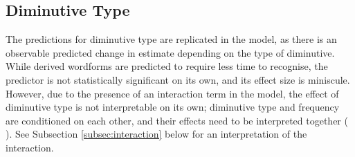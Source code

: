 \begin{table}[h]
\centering
\label{tab:reg-fixed}
\caption[Summary of fixed effects from the experimental model]{Summary of fixed effects from the experimental model. All continuous predictors centered and standardised, categorical predictor \textit{Diminutive Type} sum-coded, predictors the effects of which have achieved significance ($p$<0.05) have their names and $p$-values in boldface.}
\end{table}

\subsection{Diminutive Type} \label{subsec:dimtype}
The predictions for diminutive type are replicated in the model, as there is an observable predicted change in estimate depending on the type of diminutive. While derived wordforms are predicted to require less time to recognise, the predictor is not statistically significant on its own, and its effect size is miniscule. However, due to the presence of an interaction term in the model, the effect of diminutive type is not interpretable on its own; diminutive type and frequency are conditioned on each other, and their effects need to be interpreted together (\citeauthor{Winter+2019} \citeyear{Winter+2019}). See Subsection \ref{subsec:interaction} below for an interpretation of the interaction.
